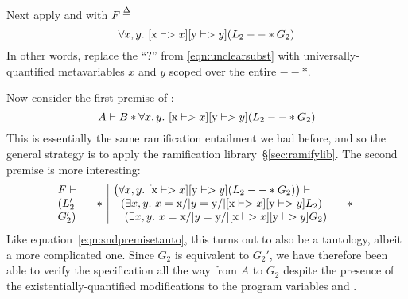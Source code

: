 
Next apply  and  with $F \defeq \null$
\vspace*{-0.75ex}
\[
\forall x, y.~ [\tx{x} |-> x][\tx{y} |-> y](L_2 --* G_2)
\vspace*{-0.75ex}
\]
In other words, replace the ``?'' from \eqref{eqn:unclearsubst} with universally-quantified metavariables $x$ and $y$ scoped over the entire $--*$.

Now consider the first premise of :
\[
A |- B * \forall x, y.~ [\text{x} |-> x][\text{y} |-> y](L_2 --* G_2)
\]
This is essentially the same ramification entailment we had before, and so the general strategy is to apply the ramification library~\S\ref{sec:ramifylib}.  The second premise is more interesting:
\[
\begin{array}{@{}l|l@{}}
F |- & \big(\forall x, y.~ [\tx{x} |-> x][\tx{y} |-> y](L_2 --* G_2) \big) |- \null \\
(L_2' --* & ~~ (\exists x,y.~ x = \tx{x} /| y = \tx{y} /| [\tx{x} |-> x][\tx{y} |-> y] L_2) --* \null \\
G_2') & \quad (\exists x,y. ~ x = \tx{x} /| y = \tx{y} /| [\tx{x} |-> x][\tx{y} |-> y] G_2)
\end{array}
\]
Like equation~\eqref{eqn:sndpremisetauto}, this turns out to also be a tautology, albeit a more complicated one.
Since $G_2$ is equivalent to $G_2'$, we have therefore been able to verify the specification all the way from $A$ to $G_2$ despite the presence of the existentially-quantified modifications to the program variables  and .


